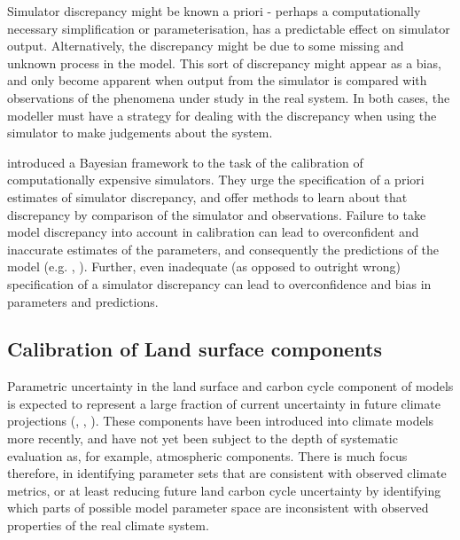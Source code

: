 \documentclass[esd, manuscript]{copernicus}
\begin{document}
Simulator discrepancy might be known a priori - perhaps a computationally necessary simplification or parameterisation, has a predictable effect on simulator output. Alternatively, the discrepancy might be due to some missing and unknown process in the model. This sort of discrepancy might appear as a bias, and only become apparent when output from the simulator is compared with observations of the phenomena under study in the real system. In both cases, the modeller must have a strategy for dealing with the discrepancy when using the simulator to make judgements about the system.

\cite{kennedy2001bayesian} introduced a Bayesian framework to the task of the calibration of computationally expensive simulators. They urge the specification of a priori estimates of simulator discrepancy, and offer methods to learn about that discrepancy by comparison of the simulator and observations. Failure to take model discrepancy into account in calibration can lead to overconfident and inaccurate estimates of the parameters, and consequently the predictions of the model (e.g. \cite{brynjarsdottir2014learning}, \cite{higdon2008calibration}). Further, even inadequate (as opposed to outright wrong) specification of a simulator discrepancy can lead to overconfidence and bias in parameters and predictions.

\subsection{Calibration of Land surface components}

Parametric uncertainty in the land surface and carbon cycle component of models is expected to represent a large fraction of current uncertainty in future climate projections (\cite{booth2012highsensitivity}, \cite{booth2013scenario}, \cite{huntingford2009contributions}). These components have been introduced into climate models more recently, and have not yet been subject to the depth of systematic evaluation as, for example, atmospheric components. There is much focus therefore, in identifying parameter sets that are consistent with observed climate metrics, or at least reducing future land carbon cycle uncertainty by identifying which parts of possible model parameter space are inconsistent with observed properties of the real climate system.  
\end{document}
